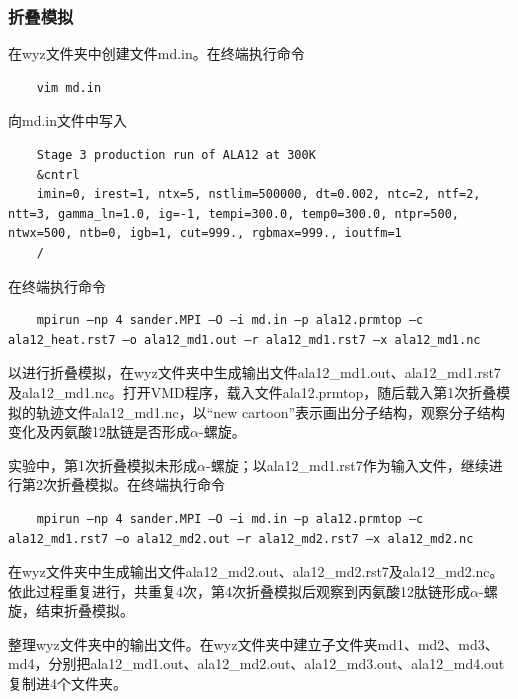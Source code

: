 \documentclass[12pt]{article}
\begin{document}
			\subsubsection{折叠模拟}
在wyz文件夹中创建文件md.in。在终端执行命令
\begin{lstlisting}
	vim md.in
\end{lstlisting}
向md.in文件中写入
\begin{lstlisting}
	Stage 3 production run of ALA12 at 300K
	&cntrl
	imin=0, irest=1, ntx=5, nstlim=500000, dt=0.002, ntc=2, ntf=2, ntt=3, gamma_ln=1.0, ig=-1, tempi=300.0, temp0=300.0, ntpr=500, ntwx=500, ntb=0, igb=1, cut=999., rgbmax=999., ioutfm=1
	/
\end{lstlisting}
在终端执行命令
\begin{lstlisting}
	mpirun –np 4 sander.MPI –O –i md.in –p ala12.prmtop –c ala12_heat.rst7 –o ala12_md1.out –r ala12_md1.rst7 –x ala12_md1.nc
\end{lstlisting}
以进行折叠模拟，在wyz文件夹中生成输出文件ala12\_md1.out、ala12\_md1.rst7及ala12\_md1.nc。打开VMD程序，载入文件ala12.prmtop，随后载入第1次折叠模拟的轨迹文件ala12\_md1.nc，以“new cartoon”表示画出分子结构，观察分子结构变化及丙氨酸12肽链是否形成$\alpha$-螺旋。\par
实验中，第1次折叠模拟未形成$\alpha$-螺旋；以ala12\_md1.rst7作为输入文件，继续进行第2次折叠模拟。在终端执行命令
\begin{lstlisting}
	mpirun –np 4 sander.MPI –O –i md.in –p ala12.prmtop –c ala12_md1.rst7 –o ala12_md2.out –r ala12_md2.rst7 –x ala12_md2.nc
\end{lstlisting}
在wyz文件夹中生成输出文件ala12\_md2.out、ala12\_md2.rst7及ala12\_md2.nc。依此过程重复进行，共重复4次，第4次折叠模拟后观察到丙氨酸12肽链形成$\alpha$-螺旋，结束折叠模拟。\par
整理wyz文件夹中的输出文件。在wyz文件夹中建立子文件夹md1、md2、md3、md4，分别把ala12\_md1.out、ala12\_md2.out、ala12\_md3.out、ala12\_md4.out
复制进4个文件夹。
\end{document}

